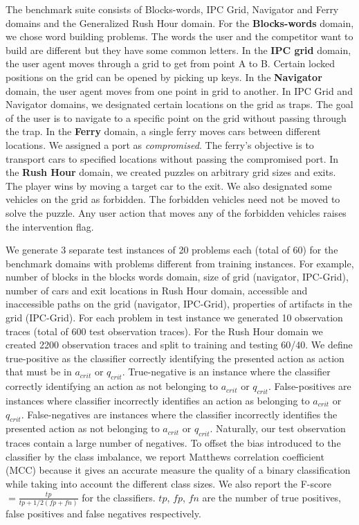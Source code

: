 \documentclass[doctor]{thesis} %
\theoremstyle{plain}
\begin{document}
The benchmark suite consists of Blocks-words, IPC Grid, Navigator and Ferry domains and the Generalized Rush Hour domain. For the \textbf{Blocks-words} domain, we chose word building problems. The words the user and the competitor want to build are different but they have some common letters. In the \textbf{IPC grid} domain, the user agent moves through a grid to get from point A to B. Certain locked positions on the grid can be opened by picking up keys. In the \textbf{Navigator} domain, the user agent moves from one point in grid to another. In IPC Grid and Navigator domains, we designated certain locations on the grid as traps. The goal of the user is to navigate to a specific point on the grid without passing through the trap. In the \textbf{Ferry} domain, a single ferry moves cars between different locations. We assigned a port as \emph{compromised}. The ferry's objective is to transport cars to specified locations without passing the compromised port. In the \textbf{Rush Hour} domain, we created puzzles on arbitrary grid sizes and exits. The player wins by moving a target car to the exit. We also designated some vehicles on the grid as forbidden. The forbidden vehicles need not be moved to solve the puzzle. Any user action that moves any of the forbidden vehicles raises the intervention flag.

We generate 3 separate test instances of 20 problems each (total of 60) for the benchmark domains with problems different from training instances. For example, number of blocks in the blocks words domain, size of grid (navigator, IPC-Grid), number of cars and exit locations  in Rush Hour domain, accessible and inaccessible paths on the grid (navigator, IPC-Grid), properties of artifacts in the grid (IPC-Grid). For each problem in test instance we generated 10 observation traces (total of 600 test observation traces). For the Rush Hour domain we created 2200 observation traces and split to training and testing 60/40. We define true-positive as the classifier correctly identifying the presented action as action that must be in $a_{crit}$ or $q_{crit}$. True-negative is an instance where the classifier  correctly identifying an action as not belonging to $a_{crit}$ or $q_{crit}$. False-positives are instances where classifier incorrectly identifies an action as belonging to $a_{crit}$ or $q_{crit}$. False-negatives are instances where the classifier incorrectly identifies the presented action as not belonging to $a_{crit}$ or $q_{crit}$. Naturally, our test observation traces contain a large number of negatives. To offset the bias introduced to the classifier by the class imbalance, we report Matthews correlation coefficient (MCC) because it gives an accurate measure the quality of a binary classification while taking into account the different class sizes. We also report the F-score $= \frac{tp}{tp+1/2(fp+fn)}$ for the classifiers. $tp$, $fp$, $fn$ are the number of true positives, false positives and false negatives respectively.
\end{document}
